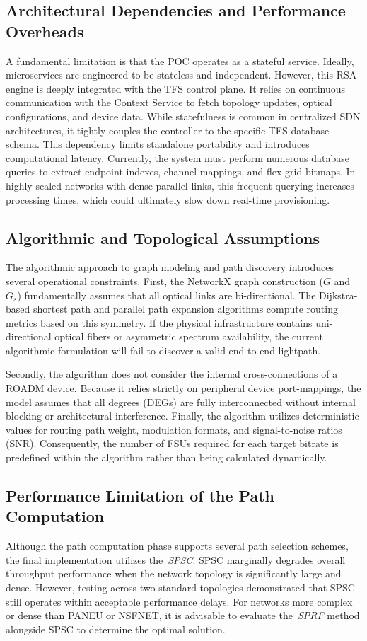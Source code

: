 \documentclass[12pt, a4paper, twoside, openright]{report}
\begin{document}
\subsection{ Architectural Dependencies and Performance Overheads}
A fundamental limitation is that the POC operates as a stateful service. Ideally, microservices are engineered to be stateless and independent. However, this RSA engine is deeply integrated with the TFS control plane. It relies on continuous communication with the Context Service to fetch topology updates, optical configurations, and device data. While statefulness is common in centralized SDN architectures, it tightly couples the controller to the specific TFS database schema. This dependency limits standalone portability and introduces computational latency. Currently, the system must perform numerous database queries to extract endpoint indexes, channel mappings, and flex-grid bitmaps. In highly scaled networks with dense parallel links, this frequent querying increases processing times, which could ultimately slow down real-time provisioning.
\subsection{ Algorithmic and Topological Assumptions}
The algorithmic approach to graph modeling and path discovery introduces several operational constraints. First, the NetworkX graph construction ($G$ and $G_s$) fundamentally assumes that all optical links are bi-directional. The Dijkstra-based shortest path and parallel path expansion algorithms compute routing metrics based on this symmetry. If the physical infrastructure contains uni-directional optical fibers or asymmetric spectrum availability, the current algorithmic formulation will fail to discover a valid end-to-end lightpath.

Secondly, the algorithm does not consider the internal cross-connections of a ROADM device. Because it relies strictly on peripheral device port-mappings, the model assumes that all degrees (DEGs) are fully interconnected without internal blocking or architectural interference. Finally, the algorithm utilizes deterministic values for routing path weight, modulation formats, and signal-to-noise ratios (SNR). Consequently, the number of FSUs required for each target bitrate is predefined within the algorithm rather than being calculated dynamically.
\subsection{ Performance Limitation of the Path Computation }
Although the path computation phase supports several path selection schemes, the final implementation utilizes the~\emph{SPSC}. SPSC marginally degrades overall throughput performance when the network topology is significantly large and dense. However, testing across two standard topologies demonstrated that SPSC still operates within acceptable performance delays. For networks more complex or dense than PANEU or NSFNET, it is advisable to evaluate the~\emph{SPRF} method alongside SPSC to determine the optimal solution.
\end{document}
